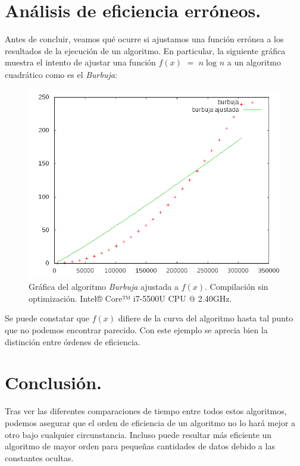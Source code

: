 \documentclass[11pt,a4paper]{article}
\begin{document}
\newpage

	\section{Análisis de eficiencia erróneos.}

		\par
		Antes de concluir, veamos qué ocurre si ajustamos una función errónea a los resultados de la ejecución de un algoritmo. En particular, la siguiente gráfica muestra el intento de ajustar una función $f(x)$ $=$ $n\log_{}n$ a un algoritmo cuadrático como es el \textit{Burbuja}:

		\begin{figure}[h]

			\centering
			\includegraphics[width=1\textwidth]{burbuja_erroneo.png}
			\caption{Gráfica del algoritmo \textit{Burbuja} ajustada a $f(x)$. Compilación sin optimización. Intel® Core™ i7-5500U CPU @ 2.40GHz.}

		\end{figure}

		\par
		Se puede constatar que $f(x)$ difiere de la curva del algoritmo hasta tal punto que no podemos encontrar parecido. Con este ejemplo se aprecia bien la distinción entre órdenes de eficiencia.

\newpage

	\section{Conclusión.}

		\par
		Tras ver las diferentes comparaciones de tiempo entre todos estos algoritmos, podemos asegurar que el orden de eficiencia de un algoritmo no lo hará mejor a otro bajo cualquier circunstancia. Incluso puede resultar más eficiente un algoritmo de mayor orden para pequeñas cantidades de datos debido a las constantes ocultas. \\
\end{document}
